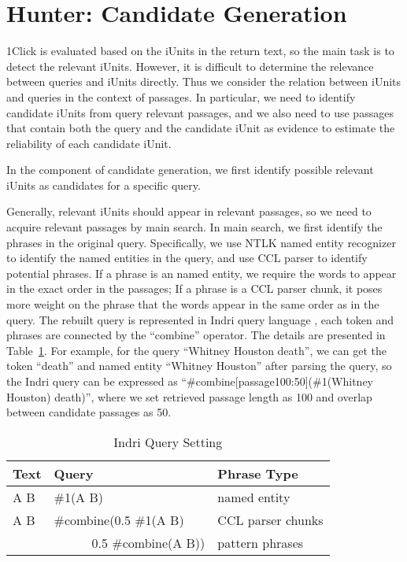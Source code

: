 \documentclass{llncs}
\begin{document}
\section{Hunter: Candidate Generation}
1Click is evaluated based on the iUnits in the return text, so the main task is to detect the relevant iUnits.
However, it is difficult to determine the relevance between queries and iUnits directly.
Thus we consider the relation between iUnits and queries in the context of passages.
In particular, we need to identify candidate iUnits from query relevant passages, and we also need to use passages that contain both the query and the candidate iUnit as evidence to estimate the reliability of each candidate iUnit.

In the component of candidate generation, we first identify possible relevant iUnits as candidates for a specific query.

Generally, relevant iUnits should appear in relevant passages, so we need to acquire relevant passages by main search.
In main search, we first identify the phrases in the original query. 
Specifically, we use NTLK named entity recognizer to identify the named entities in the query, and use CCL parser \cite{seginer_etal_ACL07} to identify potential phrases.
If a phrase is an named entity, we require the words to appear in the exact order in the passages;
If a phrase is a CCL parser chunk, it poses more weight on the phrase that the words appear in the same order as in the query. 
The rebuilt query is represented in Indri query language \cite{strohman_ICIA2005}, each token and phrases are connected by the ``combine'' operator.
The details are presented in Table~\ref{table:query}.
For example, for the query ``Whitney Houston death'', we can get the token ``death'' and named entity ``Whitney Houston'' after parsing the query, so the Indri query can be expressed as ``\#combine[passage100:50](\#1(Whitney Houston) death)'', where we set retrieved passage length as 100 and overlap between candidate passages as 50.

\begin{table}
\caption{Indri Query Setting}
\label{table:query}

\centering
\begin{tabular}{|l|l|l|}
\hline
\bf{Text} & \bf{Query} & \bf{Phrase Type} \\
\hline
\hline
A B & \#1(A B) & named entity \\
\hline
A B & \#combine(0.5 \#1(A B)  & CCL parser chunks \\
    & \ \ \ \ \ \ 0.5 \#combine(A B))     & pattern phrases \\
\hline

\end{tabular}

\end{table}
\end{document}
